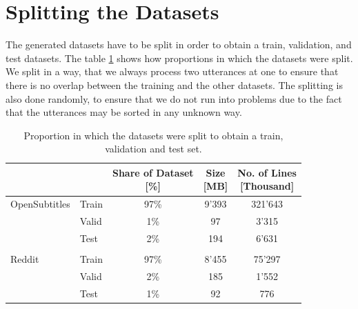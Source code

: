 \section{Splitting the Datasets}
\label{data:split_corpus}
The generated datasets have to be split in order to obtain a train, validation, and test datasets. The table \ref{tbl:data:split:corpus} shows how proportions in which the datasets were split. We split in a way, that we always process two utterances at one to ensure that there is no overlap between the training and the other datasets. The splitting is also done randomly, to ensure that we do not run into problems due to the fact that the utterances may be sorted in any unknown way.
\\
\begin{table}[H]
	\centering
	\begin{adjustbox}{max width=\textwidth}
		\centering
		\small
		\begin{tabular}{llccc}
			\toprule
			&  \specialcell{Set}
			&  \specialcell{Share of Dataset \\ {[\%]}}
			&  \specialcell{Size \\{[MB]}}
			&  \specialcell{No. of Lines \\{[Thousand]}}\\
			\midrule
			OpenSubtitles	& Train	&97\%	&9'393	&321'643	\\
			&Valid	&1\%	&97		&3'315	\\
			&Test	&2\%	&194	&6'631	\\\\
			Reddit			&Train	&97\%	&8'455	&75'297	\\
			&Valid	&2\%	&185	&1'552	\\
			&Test	&1\%	&92		&776	\\
			\bottomrule
		\end{tabular}
	\end{adjustbox}
	\caption{Proportion in which the datasets were split to obtain a train, validation and test set.}
	\label{tbl:data:split:corpus}
\end{table}

